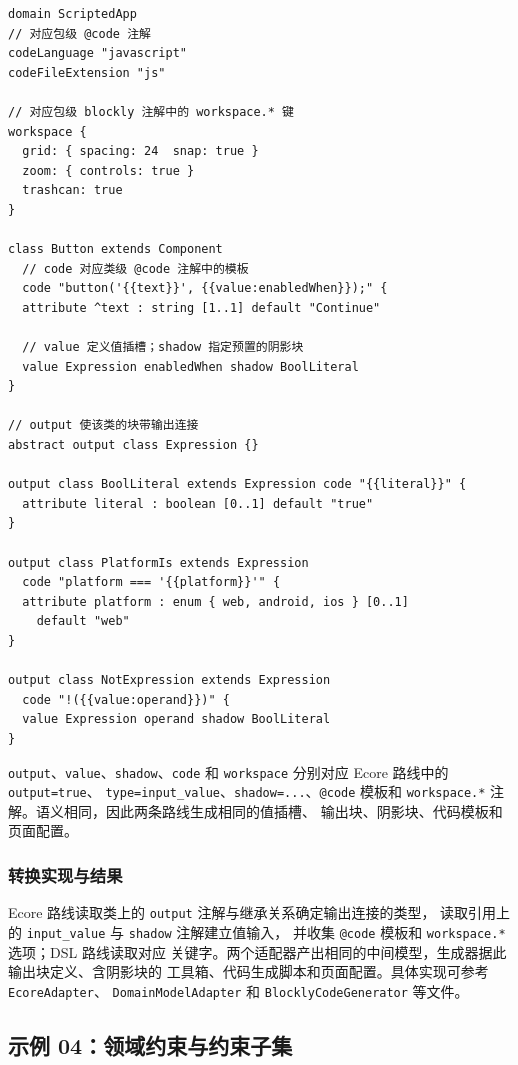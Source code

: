 \begin{lstlisting}[style=tfmm2b, captionpos=t,
caption={新增模型能力的 \texttt{.m2b} 定义},
label={lst:scripted-app-m2b}]
domain ScriptedApp
// 对应包级 @code 注解
codeLanguage "javascript"
codeFileExtension "js"

// 对应包级 blockly 注解中的 workspace.* 键
workspace {
  grid: { spacing: 24  snap: true }
  zoom: { controls: true }
  trashcan: true
}

class Button extends Component
  // code 对应类级 @code 注解中的模板
  code "button('{{text}}', {{value:enabledWhen}});" {
  attribute ^text : string [1..1] default "Continue"

  // value 定义值插槽；shadow 指定预置的阴影块
  value Expression enabledWhen shadow BoolLiteral
}

// output 使该类的块带输出连接
abstract output class Expression {}

output class BoolLiteral extends Expression code "{{literal}}" {
  attribute literal : boolean [0..1] default "true"
}

output class PlatformIs extends Expression
  code "platform === '{{platform}}'" {
  attribute platform : enum { web, android, ios } [0..1]
    default "web"
}

output class NotExpression extends Expression
  code "!({{value:operand}})" {
  value Expression operand shadow BoolLiteral
}
\end{lstlisting}

\texttt{output}、\texttt{value}、\texttt{shadow}、\texttt{code} 和
\texttt{workspace} 分别对应 Ecore 路线中的 \texttt{output=true}、
\texttt{type=input\_value}、\texttt{shadow=...}、\texttt{@code} 模板和
\texttt{workspace.*} 注解。语义相同，因此两条路线生成相同的值插槽、
输出块、阴影块、代码模板和页面配置。

\subsubsection{转换实现与结果}

Ecore 路线读取类上的 \texttt{output} 注解与继承关系确定输出连接的类型，
读取引用上的 \texttt{input\_value} 与 \texttt{shadow} 注解建立值输入，
并收集 \texttt{@code} 模板和 \texttt{workspace.*} 选项；DSL 路线读取对应
关键字。两个适配器产出相同的中间模型，生成器据此输出块定义、含阴影块的
工具箱、代码生成脚本和页面配置。具体实现可参考 \texttt{EcoreAdapter}、
\texttt{DomainModelAdapter} 和 \texttt{BlocklyCodeGenerator} 等文件。
\FloatBarrier

\subsection{示例 04：领域约束与约束子集}

